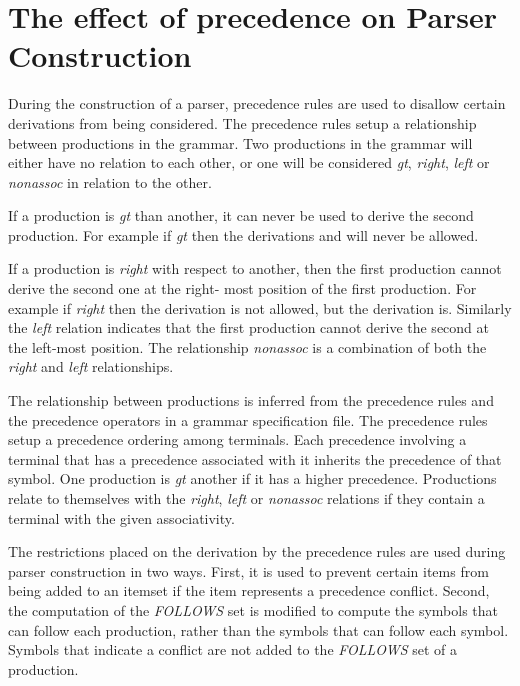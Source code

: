 \section{The effect of precedence on Parser Construction}
During the construction of a parser, precedence rules are used
to disallow certain derivations from being considered.
The precedence rules setup a relationship between productions
in the grammar.  Two productions in the grammar will either have
no relation to each other, or one will be considered
{\em gt}, {\em right}, {\em left} or {\em nonassoc} in relation
to the other.  

If a production is {\em gt} than another, it
can never be used to derive the second production.  For
example if \code{[E -> E * E]} {\em gt} \code{[E -> E + E]} then
the derivations \code{[E -> [E -> E + E] * E]} and 
\code{[E -> E * [E -> E + E]]}
will never be allowed.

If a production is {\em right} with respect to another, then
the first production cannot derive the second one at the right-
most position of the first production.  For example if
\code{[E -> E * E]} {\em right} \code{[E -> E + E]} then the
derivation \code{[E -> [E -> E + E] * E]} is not allowed, but the
derivation \code{[E -> E * [E -> E + E]]} is.  Similarly the {\em left}
relation indicates that the first production cannot derive the
second at the left-most position.  The relationship {\em nonassoc}
is a combination of both the {\em right} and {\em left} relationships.

The relationship between productions is inferred from the
precedence rules and the precedence operators in a grammar
specification file.  The precedence rules setup a precedence
ordering among terminals.  Each precedence involving a terminal
that has a precedence associated with it inherits the precedence
of that symbol.  One production is {\em gt} another if it has
a higher precedence.  Productions relate to themselves with
the {\em right}, {\em left} or {\em nonassoc} relations if they
contain a terminal with the given associativity.

The restrictions placed on the derivation by the precedence rules
are used during parser construction in two ways.  First, it
is used to prevent certain items from being added to an itemset
if the item represents a precedence conflict.  Second, the
computation of the {\em FOLLOWS} set is modified to compute
the symbols that can follow each production, rather than the
symbols that can follow each symbol.  Symbols that indicate
a conflict are not added to the {\em FOLLOWS} set of a production.


